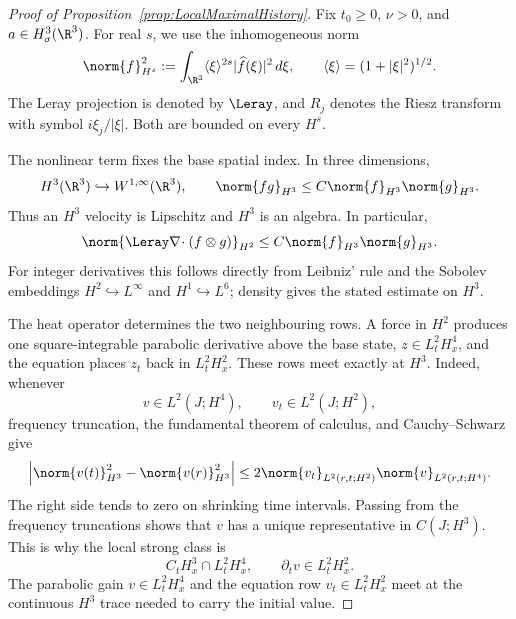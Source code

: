 \begin{proof}[Proof of Proposition~\ref{prop:LocalMaximalHistory}]
Fix \(t_0\geq0\), \(\nu>0\), and \(a\in H^3_\sigma(\R^3)\). For real \(s\),
we use the inhomogeneous norm
\[
  \norm{f}_{H^s}^2
  :=\int_{\R^3}\langle\xi\rangle^{2s}
       |\widehat f(\xi)|^2\,d\xi,
  \qquad
  \langle\xi\rangle=(1+|\xi|^2)^{1/2}.
\]
The Leray projection is denoted by \(\Leray\), and \(R_j\) denotes the Riesz
transform with symbol \(i\xi_j/|\xi|\). Both are bounded on every \(H^s\).


The nonlinear term fixes the base spatial index. In three dimensions,
\[
  H^3(\R^3)\hookrightarrow W^{1,\infty}(\R^3),
  \qquad
  \norm{fg}_{H^3}\leq C\norm{f}_{H^3}\norm{g}_{H^3}.
\]
Thus an \(H^3\) velocity is Lipschitz and \(H^3\) is an algebra. In
particular,
\begin{equation}
  \norm{\Leray\nabla\!\cdot(f\otimes g)}_{H^2}
  \leq C\norm{f}_{H^3}\norm{g}_{H^3}.
  \label{eq:LocalProductEstimate}
\end{equation}
For integer derivatives this follows directly from Leibniz' rule and the
Sobolev embeddings \(H^2\hookrightarrow L^\infty\) and
\(H^1\hookrightarrow L^6\); density gives the stated estimate on \(H^3\).

The heat operator determines the two neighbouring rows. A force in \(H^2\)
produces one square-integrable parabolic derivative above the base state,
\(z\in L^2_tH^4_x\), and the equation places \(z_t\) back in
\(L^2_tH^2_x\). These rows meet exactly at \(H^3\). Indeed, whenever
\[
  v\in L^2(J;H^4),
  \qquad
  v_t\in L^2(J;H^2),
\]
frequency truncation, the fundamental theorem of calculus, and
Cauchy--Schwarz give
\begin{equation}
  \left|
    \norm{v(t)}_{H^3}^2-\norm{v(r)}_{H^3}^2
  \right|
  \leq
  2\norm{v_t}_{L^2(r,t;H^2)}
   \norm{v}_{L^2(r,t;H^4)}.
  \label{eq:LocalAdjacentTrace}
\end{equation}
The right side tends to zero on shrinking time intervals. Passing from the
frequency truncations shows that \(v\) has a unique representative in
\(C(J;H^3)\). This is why the local strong class is
\[
  C_tH^3_x\cap L^2_tH^4_x,
  \qquad
  \partial_t v\in L^2_tH^2_x.
\]
The parabolic gain \(v\in L^2_tH^4_x\) and the equation row
\(v_t\in L^2_tH^2_x\) meet at the continuous \(H^3\) trace needed to carry the
initial value.



\end{proof}
